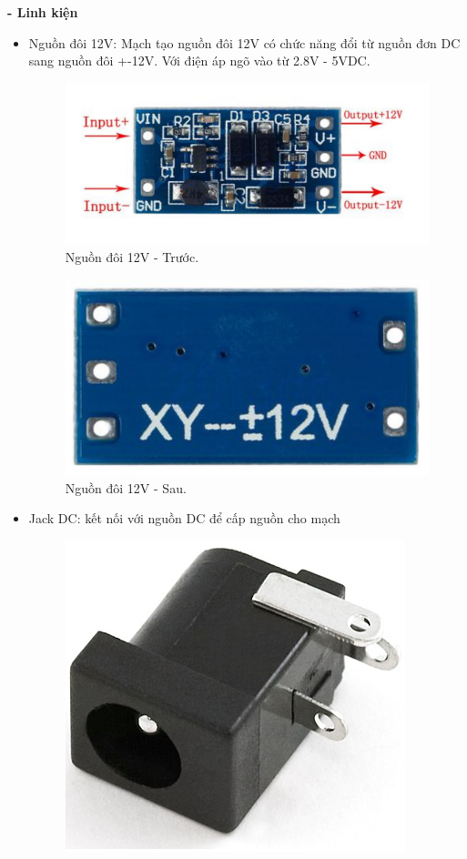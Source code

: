 \documentclass[a4paper,12pt,oneside]{article}
\begin{document}
\textbf{- Linh kiện}
\begin{itemize}
\item	Nguồn đôi 12V: Mạch tạo nguồn đôi 12V có chức năng đổi từ nguồn đơn DC sang nguồn đôi +-12V. Với điện áp ngõ vào từ 2.8V - 5VDC.
\begin{figure}[H]
\centering
\begin{center}
\includegraphics[scale=.7]{hinh/PPM/ppm_12vtruoc.png}
\end{center}
\caption{Nguồn đôi 12V - Trước.}
\end{figure}
\begin{figure}[H]
\centering
\begin{center}
\includegraphics[scale=.4]{hinh/PPM/ppm_12vsau.png}
\end{center}
\caption{Nguồn đôi 12V - Sau.}
\end{figure}
\item	Jack DC: kết nối với nguồn DC để cấp nguồn cho mạch
\begin{figure}[H]
\centering
\begin{center}
\includegraphics[scale=.3]{hinh/PPM/ppm_jackdc.jpg}

\end{center}
\end{figure}
\end{itemize}
\end{document}
